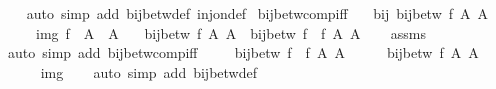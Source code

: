 \begin{isabellebody}
\ \ %
\endisadelimproof
%
\isatagproof
{}\isamarkupfalse%
\ {\isacharparenleft}{\kern0pt}auto\ simp\ add{\isacharcolon}{\kern0pt}\ bij{\isacharunderscore}{\kern0pt}betw{\isacharunderscore}{\kern0pt}def\ inj{\isacharunderscore}{\kern0pt}on{\isacharunderscore}{\kern0pt}def{\isacharparenright}{\kern0pt}%
\endisatagproof
{\isafoldproof}%
%
\isadelimproof
\isanewline
%
\endisadelimproof
\isanewline
{}\isamarkupfalse%
\ bij{\isacharunderscore}{\kern0pt}betw{\isacharunderscore}{\kern0pt}comp{\isacharunderscore}{\kern0pt}iff{}{\isacharcolon}{\kern0pt}\isanewline
\ \ \ bij{\isacharcolon}{\kern0pt}\ {\isachardoublequoteopen}bij{\isacharunderscore}{\kern0pt}betw\ f{\isacharprime}{\kern0pt}\ A{\isacharprime}{\kern0pt}\ A{\isacharprime}{\kern0pt}{\isacharprime}{\kern0pt}{\isachardoublequoteclose}\isanewline
\ \ \ \ \ img{\isacharcolon}{\kern0pt}\ {\isachardoublequoteopen}f\ {\isacharbackquote}{\kern0pt}\ A\ {\isasymle}\ A{\isacharprime}{\kern0pt}{\isachardoublequoteclose}\isanewline
\ \ \ {\isachardoublequoteopen}bij{\isacharunderscore}{\kern0pt}betw\ f\ A\ A{\isacharprime}{\kern0pt}\ {\isasymlongleftrightarrow}\ bij{\isacharunderscore}{\kern0pt}betw\ {\isacharparenleft}{\kern0pt}f{\isacharprime}{\kern0pt}\ {\isasymcirc}\ f{\isacharparenright}{\kern0pt}\ A\ A{\isacharprime}{\kern0pt}{\isacharprime}{\kern0pt}{\isachardoublequoteclose}\isanewline
%
\isadelimproof
\ \ %
\endisadelimproof
%
\isatagproof
{}\isamarkupfalse%
\ assms\isanewline
{}\isamarkupfalse%
\ {\isacharparenleft}{\kern0pt}auto\ simp\ add{\isacharcolon}{\kern0pt}\ bij{\isacharunderscore}{\kern0pt}betw{\isacharunderscore}{\kern0pt}comp{\isacharunderscore}{\kern0pt}iff{\isacharparenright}{\kern0pt}\isanewline
\ \ \isamarkupfalse%
\ {\isacharasterisk}{\kern0pt}{\isacharcolon}{\kern0pt}\ {\isachardoublequoteopen}bij{\isacharunderscore}{\kern0pt}betw\ {\isacharparenleft}{\kern0pt}f{\isacharprime}{\kern0pt}\ {\isasymcirc}\ f{\isacharparenright}{\kern0pt}\ A\ A{\isacharprime}{\kern0pt}{\isacharprime}{\kern0pt}{\isachardoublequoteclose}\isanewline
\ \ \isamarkupfalse%
\ \isamarkupfalse%
\ {\isachardoublequoteopen}bij{\isacharunderscore}{\kern0pt}betw\ f\ A\ A{\isacharprime}{\kern0pt}{\isachardoublequoteclose}\isanewline
\ \ \ \ \isamarkupfalse%
\ img\isanewline
\ \ \isamarkupfalse%
\ {\isacharparenleft}{\kern0pt}auto\ simp\ add{\isacharcolon}{\kern0pt}\ bij{\isacharunderscore}{\kern0pt}betw{\isacharunderscore}{\kern0pt}def{\isacharparenright}{\kern0pt}\isanewline

\end{isabellebody}

